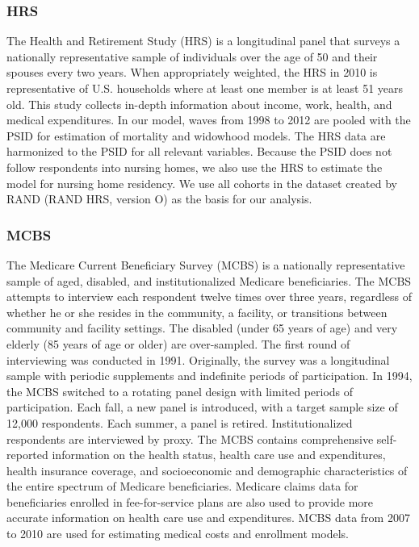 \subsubsection{HRS}

\noindent The Health and Retirement Study (HRS) is a longitudinal panel that surveys a nationally representative sample of individuals over the age of 50 and their spouses every two years. When appropriately weighted, the HRS in 2010 is representative of U.S. households 
where at least one member is at least 51 years old.
This study collects in-depth information about income, work, health, and medical expenditures. In our model, waves from 1998 to 2012 are pooled with the PSID for estimation of mortality and 
widowhood models. The HRS data
are harmonized to the PSID for all relevant variables. Because the PSID does not follow respondents into nursing homes, we also use the HRS to estimate the model for nursing home residency. We use all cohorts in the dataset created by RAND (RAND HRS, version O) as the basis 
for our analysis. \\

\subsubsection{MCBS}
\noindent The Medicare Current Beneficiary Survey (MCBS) is a nationally representative sample of aged, disabled, 
and institutionalized Medicare beneficiaries. The MCBS attempts to interview each respondent twelve 
times over three years, regardless of whether he or she resides in the community, a facility, or 
transitions between community and facility settings. The disabled (under 65 years of age) and 
very elderly (85 years of age or older) are over-sampled. The first round of interviewing was conducted 
in 1991. Originally, the survey was a longitudinal sample with periodic supplements and indefinite 
periods of participation. In 1994, the MCBS switched to a rotating panel design with limited periods 
of participation. Each fall, a new panel is introduced, with a target sample size of 12,000 respondents. Each summer, a panel is retired. Institutionalized respondents are interviewed by proxy. The MCBS 
contains comprehensive self-reported information on the health status, health care use and 
expenditures, health insurance coverage, and socioeconomic and demographic characteristics of the 
entire spectrum of Medicare beneficiaries. Medicare claims data for beneficiaries enrolled in 
fee-for-service plans are also used to provide more accurate information on health care use and 
expenditures. MCBS data from 2007 to 2010 are used for estimating medical costs and enrollment models. \\

